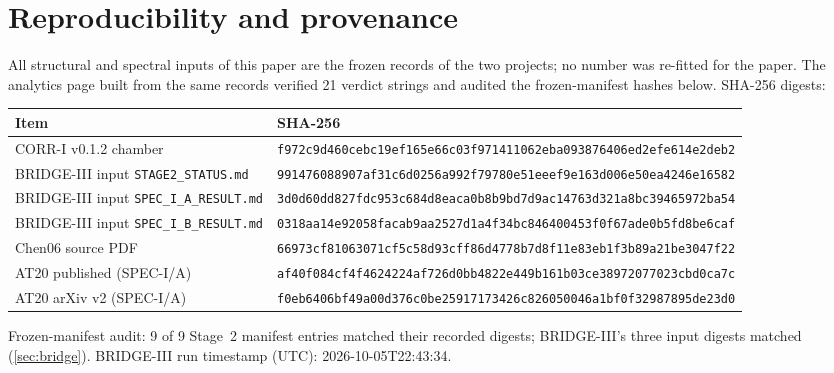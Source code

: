\documentclass[11pt,a4paper]{article}
\theoremstyle{definition}
\theoremstyle{remark}
\begin{document}
\section{Reproducibility and provenance}\label{app:repro}
\noindent All structural and spectral inputs of this paper are the frozen records of the two projects; no number was re-fitted for the paper. The analytics page built from the same records verified 21 verdict strings and audited the frozen-manifest hashes below. SHA-256 digests:

\begin{tabular}{@{}>{\raggedright\arraybackslash}p{4.4cm}l@{}}\toprule Item & SHA-256\\\midrule
CORR-I v0.1.2 chamber & \texttt{\scriptsize f972c9d460cebc19ef165e66c03f971411062eba093876406ed2efe614e2deb2}\\
BRIDGE-III input \texttt{STAGE2\_STATUS.md} & \texttt{\scriptsize 991476088907af31c6d0256a992f79780e51eeef9e163d006e50ea4246e16582} \\
BRIDGE-III input \texttt{SPEC\_I\_A\_RESULT.md} & \texttt{\scriptsize 3d0d60dd827fdc953c684d8eaca0b8b9bd7d9ac14763d321a8bc39465972ba54} \\
BRIDGE-III input \texttt{SPEC\_I\_B\_RESULT.md} & \texttt{\scriptsize 0318aa14e92058facab9aa2527d1a4f34bc846400453f0f67ade0b5fd8be6caf} \\
Chen06 source PDF & \texttt{\scriptsize 66973cf81063071cf5c58d93cff86d4778b7d8f11e83eb1f3b89a21be3047f22}\\
AT20 published (SPEC-I/A) & \texttt{\scriptsize af40f084cf4f4624224af726d0bb4822e449b161b03ce38972077023cbd0ca7c}\\
AT20 arXiv v2 (SPEC-I/A) & \texttt{\scriptsize f0eb6406bf49a00d376c0be25917173426c826050046a1bf0f32987895de23d0}\\
\bottomrule\end{tabular}

\medskip
\noindent Frozen-manifest audit: 9 of 9 Stage~2 manifest entries matched their recorded digests; BRIDGE-III's three input digests matched (\cref{sec:bridge}). BRIDGE-III run timestamp (UTC): 2026-10-05T22:43:34.
\end{document}
